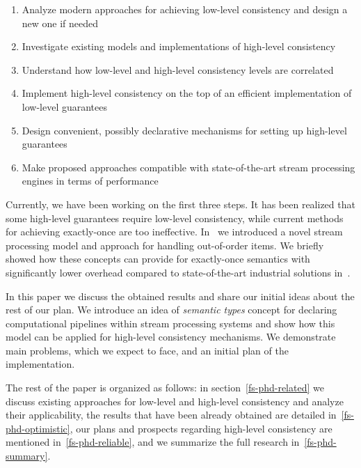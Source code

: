 \begin{enumerate}
    \item Analyze modern approaches for achieving low-level consistency and design a new one if needed
    \item Investigate existing models and implementations of high-level consistency
    \item Understand how low-level and high-level consistency levels are correlated
    \item Implement high-level consistency on the top of an efficient implementation of low-level guarantees
    \item Design convenient, possibly declarative mechanisms for setting up high-level guarantees
    \item Make proposed approaches compatible with state-of-the-art stream processing engines in terms of performance
\end{enumerate}

Currently, we have been working on the first three steps. It has been realized that some high-level guarantees require low-level consistency, while current methods for achieving exactly-once are too ineffective. In~\cite{we2018seim} we introduced a novel stream processing model and approach for handling out-of-order items. We briefly showed how these concepts can provide for exactly-once semantics with significantly lower overhead compared to state-of-the-art industrial solutions in~\cite{we2018beyondmr}. 

In this paper we discuss the obtained results and share our initial ideas about the rest of our plan. We introduce an idea of {\em semantic types} concept for declaring computational pipelines within stream processing systems and show how this model can be applied for high-level consistency mechanisms. We demonstrate main problems, which we expect to face, and an initial plan of the implementation.

The rest of the paper is organized as follows: in section~\ref{fs-phd-related} we discuss existing approaches for low-level and high-level consistency and analyze their applicability, the results that have been already obtained are detailed in~\ref{fs-phd-optimistic}, our plans and prospects regarding high-level consistency are mentioned in~\ref{fs-phd-reliable}, and we summarize the full research in~\ref{fs-phd-summary}.

